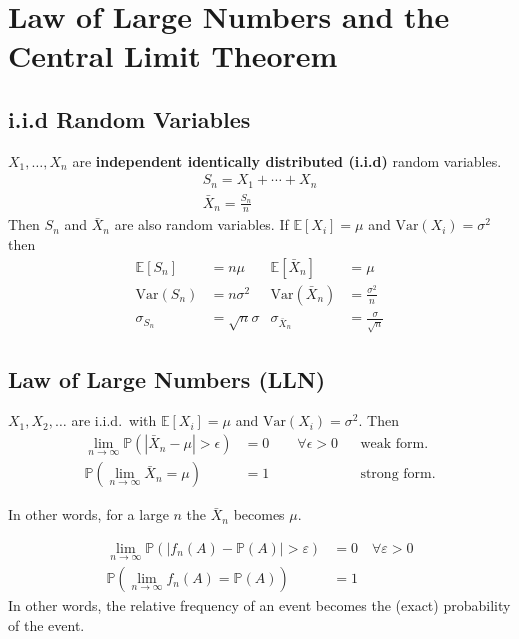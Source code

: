 \section{Law of Large Numbers and the Central Limit Theorem}

\subsection{i.i.d Random Variables}

$X_1, \ldots , X_n$ are \textbf{independent identically distributed (i.i.d)} random variables.
\begin{gather*}
    S_n = X_1 + \cdots + X_n \\
    \bar{X}_n = \frac{S_n}{n}
\end{gather*}
Then $S_n$ and $ \bar{X}_n$ are also random variables.
\newpar{}
If $\mathbb{E}[X_i]=\mu$ and $\mathrm{Var}(X_i)=\sigma^2$ then
\begin{align*}
    \mathbb{E}[S_n]         & =n\mu                    & 
    \mathbb{E}[\bar{X}_n]   & =\mu                         \\
    \mathrm{Var}(S_n)       & =n\sigma^2               & 
    \mathrm{Var}(\bar{X}_n) & =\frac{\sigma^2}{n}          \\
    \sigma_{S_n}            & =\sqrt{n}\sigma          & 
    \sigma_{\bar{X}_n}      & =\frac{\sigma}{\sqrt{n}}
\end{align*}

\subsection{Law of Large Numbers (LLN)}
$X_1, X_2, \ldots$ are i.i.d.\ with $\mathbb{E}[X_i]=\mu$ and $\mathrm{Var}(X_i)=\sigma^2$. Then
\begin{align*}
    \lim_{n\to\infty}\mathbb{P}\left(\left|\bar{X}_n-\mu\right|>\epsilon\right) & =0 \qquad \forall \epsilon > 0 &  & \text{weak form.}   \\
    \mathbb{P}\left(\lim_{n\to\infty}\bar{X}_n=\mu\right)                       & =1                             &  & \text{strong form.}
\end{align*}

In other words, for a large $n$ the $\bar{X}_n$ becomes $\mu$.

\newpar{}
\begin{align*}
    \lim_{n\to\infty}\mathbb{P}(|f_n(A)-\mathbb{P}(A)|>\varepsilon) & =0\quad \forall \varepsilon>0 \\
    \mathbb{P}\left(\lim_{n\to\infty}f_n(A)=\mathbb{P}(A)\right)    & =1
\end{align*}
In other words, the relative frequency of an event becomes the (exact) probability of the event.


